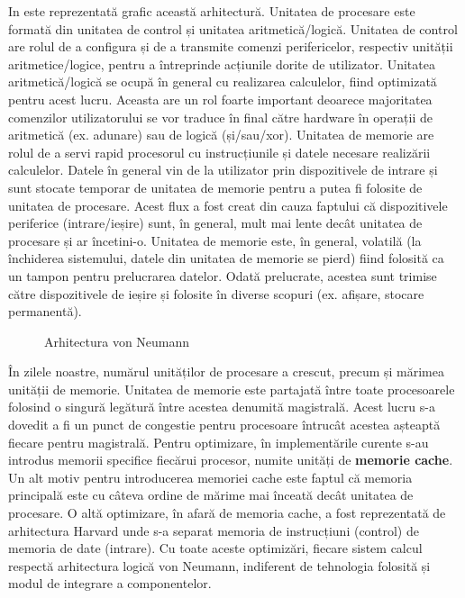 In  este reprezentată grafic această
arhitectură. Unitatea de procesare este formată din unitatea de control și
unitatea aritmetică/logică. Unitatea de control are rolul de a configura și de a transmite
comenzi perifericelor, respectiv unității aritmetice/logice, pentru a
întreprinde acțiunile dorite de utilizator. Unitatea aritmetică/logică se ocupă
în general cu realizarea calculelor, fiind optimizată pentru acest lucru.
Aceasta are un rol foarte important deoarece majoritatea comenzilor
utilizatorului se vor traduce în final către hardware în operații de aritmetică
(ex. adunare) sau de logică (și/sau/xor). Unitatea de memorie are rolul de a
servi rapid procesorul cu instrucțiunile și datele necesare realizării calculelor. Datele în
general vin de la utilizator prin dispozitivele de intrare și sunt stocate
temporar de unitatea de memorie pentru a putea fi folosite de unitatea de
procesare. Acest flux a fost creat din cauza faptului că dispozitivele
periferice (intrare/ieșire) sunt, în general, mult mai lente decât unitatea de
procesare și ar încetini-o. Unitatea de memorie este, în general, volatilă (la
închiderea sistemului, datele din unitatea de memorie se pierd) fiind folosită
ca un tampon pentru prelucrarea datelor. Odată prelucrate, acestea sunt trimise
către dispozitivele de ieșire și folosite în diverse scopuri (ex. afișare, stocare
permanentă).

\begin{figure}[!htbp]
	\centering
	\def\svgwidth{0.8\columnwidth}
	
	\caption{Arhitectura von Neumann}
	\label{fig:hw:von-neumann}
\end{figure}

În zilele noastre, numărul unităților de procesare a crescut, precum și mărimea
unității de memorie. Unitatea de memorie este partajată între toate
procesoarele folosind o singură legătură între acestea denumită magistrală.
Acest lucru s-a dovedit a fi un punct de congestie pentru procesoare întrucât
acestea așteaptă fiecare pentru magistrală. Pentru optimizare, în implementările
curente s-au introdus memorii specifice fiecărui procesor, numite unități de \textbf{memorie cache}. Un alt
motiv pentru introducerea memoriei cache este faptul că memoria
principală este cu câteva ordine de mărime mai înceată decât unitatea de
procesare. O altă optimizare, în afară de memoria cache, a fost reprezentată de
arhitectura Harvard unde s-a separat memoria de instrucțiuni (control) de
memoria de date (intrare). Cu toate aceste optimizări, fiecare sistem calcul
respectă arhitectura logică von Neumann, indiferent de tehnologia folosită și
modul de integrare a componentelor.

